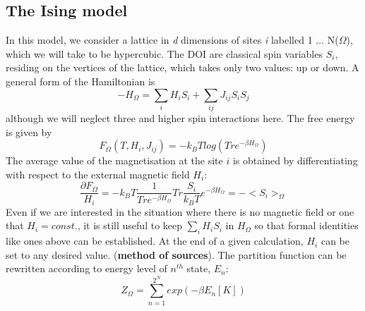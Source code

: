 \documentclass[12pt,titlepage]{article}
\numberwithin{equation}{section}
\begin{document}
\subsection{The Ising model}
In this model, we consider a lattice in \textit{d} dimensions of sites {\textit{i}} labelled 1 ... N($\Omega$), which we will take to be hypercubic. The DOI are classical spin variables $S_i$, residing on the vertices of the lattice, which takes only two values: up or down. A general form of the Hamiltonian is 
\begin{equation}
\label{isinghamil}
    -H_{\Omega} = \sum_{{i}}H_iS_i+\sum_{ij}J_{ij}S_iS_j
\end{equation}
although we will neglect three and higher spin interactions here. The free energy is given by
\begin{equation}
    F_{\Omega}(T, H_i, J_{ij}) = -k_BTlog(Tre^{-\beta H_{\Omega}})
\end{equation}
The average value of the magnetisation at the site $i$ is obtained by differentiating with respect to the external magnetic field $H_i$:
\begin{equation}
    \frac{\partial F_{\Omega}}{H_i}=-k_BT\frac{1}{Tr e^{-\beta H_{\Omega}}}Tr\frac{S_i}{k_BT}e^{-\beta H_{\Omega}}=-<S_i>_{\Omega}
\end{equation}
Even if we are interested in the situation where there is no magnetic field or one that $H_i=const.$, it is still useful to keep $\sum_{{i}}H_iS_i$ in $H_{\Omega}$ so that formal identities like ones above can be established. At the end of a given calculation, $H_i$ can be set to any desired value. (\textbf{method of sources}). The partition function can be rewritten according to energy level of $n^{th}$ state, $E_n$:
\begin{equation}
    Z_{\Omega}=\sum_{n=1}^{2^N}exp(-\beta E_n[K])
\end{equation}
\end{document}
